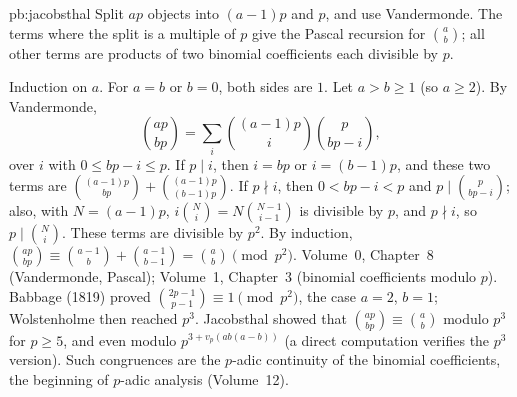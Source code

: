 \begin{solution}{pb:jacobsthal}
\idea Split $ap$ objects into $(a-1)p$ and $p$, and use Vandermonde. The terms where the split is a multiple of $p$ give the
Pascal recursion for $\binom ab$; all other terms are products of two binomial coefficients each divisible by $p$.

\writeup Induction on $a$. For $a=b$ or $b=0$, both sides are $1$. Let $a>b\ge1$ (so $a\ge2$). By Vandermonde,
\[
\binom{ap}{bp}=\sum_i\binom{(a-1)p}i\binom p{bp-i},
\]
over $i$ with $0\le bp-i\le p$. If $p\mid i$, then $i=bp$ or $i=(b-1)p$, and these two terms are $\binom{(a-1)p}{bp}+\binom{(a-1)p}{(b-1)p}$. If
$p\nmid i$, then $0<bp-i<p$ and $p\mid\binom p{bp-i}$; also, with $N=(a-1)p$, $i\binom Ni=N\binom{N-1}{i-1}$ is divisible by $p$, and $p\nmid i$,
so $p\mid\binom Ni$. These terms are divisible by $p^2$. By induction,
$\binom{ap}{bp}\equiv\binom{a-1}b+\binom{a-1}{b-1}=\binom ab\pmod{p^2}$.
\tools Volume~0, Chapter~8 (Vandermonde, Pascal); Volume~1, Chapter~3 (binomial coefficients modulo $p$).
\leads Babbage (1819) proved $\binom{2p-1}{p-1}\equiv1\pmod{p^2}$, the case $a=2$, $b=1$; Wolstenholme then reached $p^3$. Jacobsthal showed that
$\binom{ap}{bp}\equiv\binom ab$ modulo $p^3$ for $p\ge5$, and even modulo $p^{3+v_p(ab(a-b))}$ (a direct computation verifies the $p^3$ version). Such
congruences are the $p$-adic continuity of the binomial coefficients, the beginning of $p$-adic analysis (Volume~12).
\end{solution}

